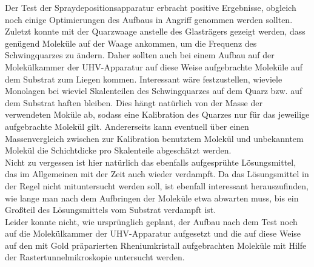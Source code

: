 % 

% 
% 



Der Test der Spraydepositionsapparatur erbracht positive Ergebnisse, obgleich noch einige
Optimierungen des Aufbaus in Angriff genommen werden sollten.
Zuletzt konnte mit der Quarzwaage anstelle des
Glasträgers gezeigt werden, dass genügend Moleküle auf der Waage ankommen, um die Frequenz des Schwingquarzes zu ändern. Daher sollten auch
bei einem Aufbau auf der Molekülkammer der UHV-Apparatur auf diese Weise aufgebrachte Moleküle auf
dem Substrat zum Liegen kommen. Interessant wäre festzustellen, wieviele Monolagen bei wieviel
Skalenteilen des Schwingquarzes auf dem Quarz bzw. auf dem Substrat haften bleiben. Dies hängt
natürlich von der Masse der verwendeten Moküle ab, sodass eine Kalibration des Quarzes nur für das
jeweilige aufgebrachte Molekül gilt. Andererseits kann eventuell über einen Massenvergleich zwischen
zur Kalibration benutztem Molekül und unbekanntem Molekül die Schichtdicke pro Skalenteile
abgeschätzt werden.\\
Nicht zu vergessen ist hier natürlich das ebenfalls aufgesprühte Lösungsmittel, das im
Allgemeinen mit der Zeit auch wieder verdampft. Da das Lösungsmittel in der Regel nicht
mituntersucht werden soll, ist ebenfall interessant herauszufinden, wie lange man nach dem
Aufbringen der Moleküle etwa abwarten muss, bis ein Großteil des Lösungsmittels vom Substrat
verdampft ist.\\

Leider konnte nicht, wie ursprünglich geplant, der Aufbau nach dem Test noch auf die Molekülkammer
der UHV-Apparatur aufgesetzt und die auf diese Weise auf den mit Gold präparierten Rheniumkristall
aufgebrachten Moleküle mit Hilfe der Rastertunnelmikroskopie untersucht werden.
